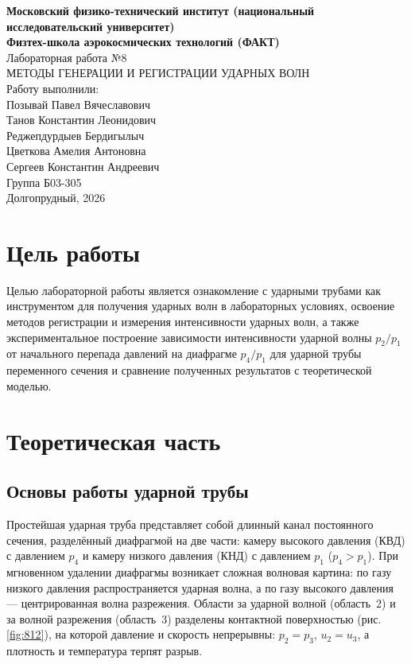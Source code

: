 \documentclass[12pt,a4paper]{article}
\begin{document}
\begin{titlepage}
    \begin{center}
        \textbf{Московский физико-технический институт (национальный исследовательский университет)} \\
        \textbf{Физтех-школа аэрокосмических технологий (ФАКТ)} \\
        \vspace{3cm}
        \Large{Лабораторная работа №8} \\
        \Huge{МЕТОДЫ ГЕНЕРАЦИИ И РЕГИСТРАЦИИ УДАРНЫХ ВОЛН} \\
        \vspace{2cm}
        \large{Работу выполнили:} \\
        \large{Позывай Павел Вячеславович} \\
        \large{Танов Константин Леонидович} \\
        \large{Реджепдурдыев Бердигылыч} \\
        \large{Цветкова Амелия Антоновна} \\
        \large{Сергеев Константин Андреевич} \\
        \vfill
        \large{Группа Б03-305} \\
        \large{Долгопрудный, 2026}
    \end{center}
\end{titlepage}

\tableofcontents
\newpage

\section{Цель работы}
Целью лабораторной работы является ознакомление с ударными трубами как инструментом для получения ударных волн в лабораторных условиях, освоение методов регистрации и измерения интенсивности ударных волн, а также экспериментальное построение зависимости интенсивности ударной волны $p_2/p_1$ от начального перепада давлений на диафрагме $p_4/p_1$ для ударной трубы переменного сечения и сравнение полученных результатов с теоретической моделью.

\section{Теоретическая часть}
\subsection{Основы работы ударной трубы}
Простейшая ударная труба представляет собой длинный канал постоянного сечения, разделённый диафрагмой на две части: камеру высокого давления (КВД) с давлением $p_4$ и камеру низкого давления (КНД) с давлением $p_1$ ($p_4 > p_1$). При мгновенном удалении диафрагмы возникает сложная волновая картина: по газу низкого давления распространяется ударная волна, а по газу высокого давления — центрированная волна разрежения. Области за ударной волной (область~2) и за волной разрежения (область~3) разделены контактной поверхностью (рис. \ref{fig:812}), на которой давление и скорость непрерывны: $p_2 = p_3$, $u_2 = u_3$, а плотность и температура терпят разрыв.
\end{document}

